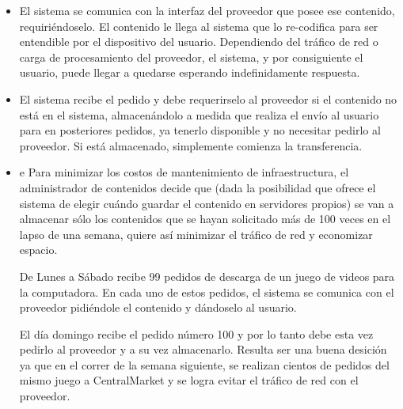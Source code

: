 \documentclass[11pt, a4paper, spanish]{article}
\begin{document}
	\begin{itemize}
	
	\item{ El sistema se comunica con la interfaz del proveedor que posee ese contenido, requiri\'endoselo. El contenido le llega al sistema que lo re-codifica para ser entendible por el dispositivo del usuario. Dependiendo del tr\'afico de red o carga de procesamiento del proveedor, el sistema, y por consiguiente el usuario, puede llegar a quedarse esperando indefinidamente respuesta.}

	\item{ El sistema recibe el pedido y debe requerirselo al proveedor si el contenido no est\'a en el sistema, almacen\'andolo a medida que realiza el env\'io al usuario para en posteriores pedidos, ya tenerlo disponible y no necesitar pedirlo al proveedor. Si est\'a almacenado, simplemente comienza la transferencia.}

	\item{e Para minimizar los costos de mantenimiento de infraestructura, el administrador de contenidos decide que (dada la posibilidad que ofrece el sistema de elegir cu\'ando guardar el contenido en servidores propios) se van a almacenar s\'olo los contenidos que se hayan solicitado m\'as de 100 veces en el lapso de una semana, quiere as\'i minimizar el tr\'afico de red y economizar espacio.}

	De Lunes a S\'abado recibe 99 pedidos de descarga de un juego de videos para la computadora. En cada uno de estos pedidos, el sistema se comunica con el proveedor pidi\'endole el contenido y d\'andoselo al usuario.

	El d\'ia domingo recibe el pedido n\'umero 100 y por lo tanto debe esta vez pedirlo al proveedor y a su vez almacenarlo. Resulta ser una buena desici\'on ya que en el correr de la semana siguiente, se realizan cientos de pedidos del mismo juego a CentralMarket y se logra evitar el tr\'afico de red con el proveedor.

	\end{itemize}
\end{document}
